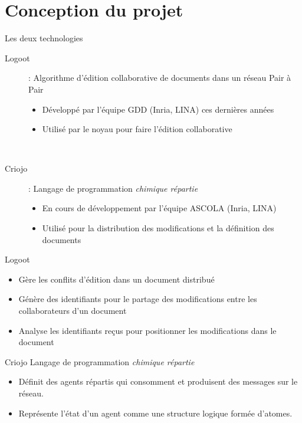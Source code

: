 \section{Conception du projet}
\begin{frame}{Les deux technologies}
\begin{description}
\item [Logoot] : Algorithme d'édition collaborative de documents dans un réseau
    Pair à Pair
  \begin{itemize}
    \item Développé par l'équipe GDD (Inria, LINA) ces dernières années
    \item Utilisé par le noyau pour faire l'édition collaborative
  \end{itemize} ~
\item [Criojo] : Langage de programmation \emph{chimique répartie}
  \begin{itemize}
    \item En cours de développement par l'équipe ASCOLA (Inria, LINA)
    \item Utilisé pour la distribution des modifications et la définition
    des documents
  \end{itemize}
\end{description}
\end{frame}

\begin{frame}{Logoot}
\begin{itemize}
  \item Gère les conflits d'édition dans un document distribué
  \item Génère des identifiants pour le partage des modifications entre les
  collaborateurs d'un document
  \item Analyse les identifiants reçus pour positionner les modifications dans
  le document
\end{itemize}
\end{frame}

\begin{frame}{Criojo}
Langage de programmation \emph{chimique répartie}
\begin{itemize}
  \item Définit des agents répartis qui consomment et produisent des messages
  sur le réseau.
  \item Représente l'état d'un agent comme une structure logique formée
  d'atomes.
\end{itemize}
\end{frame}

